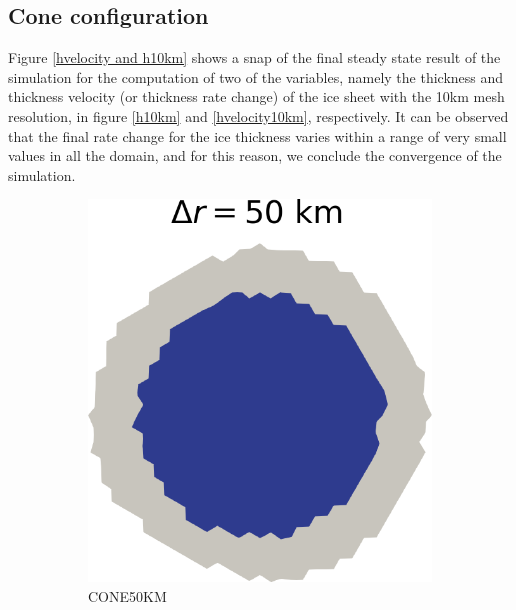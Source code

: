 \documentclass{article}
\begin{document}
\subsection{Cone configuration}

Figure \ref{hvelocity and h10km} shows a snap of the final steady state result of the simulation for the computation of two of the variables, namely the thickness and thickness velocity (or thickness rate change) of the ice sheet with the 10km mesh resolution, in figure \ref{h10km} and \ref{hvelocity10km}, respectively. It can be observed that the final rate change for the ice thickness varies within a range of very small values in all the domain, and for this reason, we conclude the convergence of the simulation. 

\begin{figure}[!h]
	\centering %
	\begin{subfigure}{0.25\textwidth}
		\includegraphics[width=\linewidth]{../fig/Grounded_zone_50km_CONE.png}
		\caption{CONE50KM}
		\label{figCONE50KM}
	\end{subfigure}\hfil %
	\begin{subfigure}{0.25\textwidth}

\end{subfigure}
\end{figure}
\end{document}
